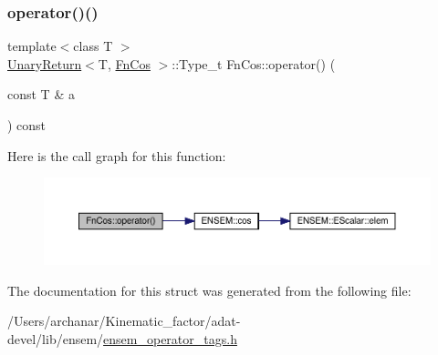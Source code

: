 \subsubsection{\texorpdfstring{operator()()}{operator()()}\hspace{0.1cm}{\footnotesize\ttfamily [3/3]}}
{\footnotesize\ttfamily template$<$class T $>$ \\
\mbox{\hyperlink{structUnaryReturn}{Unary\+Return}}$<$T, \mbox{\hyperlink{structFnCos}{Fn\+Cos}} $>$\+::Type\+\_\+t Fn\+Cos\+::operator() (\begin{DoxyParamCaption}\item[{const T \&}]{a }\end{DoxyParamCaption}) const\hspace{0.3cm}{\ttfamily [inline]}}

Here is the call graph for this function\+:
\nopagebreak
\begin{figure}[H]
\begin{center}
\leavevmode
\includegraphics[width=350pt]{d1/d49/structFnCos_aaf33b1555b7687d8c211c90189ef0c5c_cgraph}
\end{center}
\end{figure}


The documentation for this struct was generated from the following file\+:\begin{DoxyCompactItemize}
\item 
/\+Users/archanar/\+Kinematic\+\_\+factor/adat-\/devel/lib/ensem/\mbox{\hyperlink{adat-devel_2lib_2ensem_2ensem__operator__tags_8h}{ensem\+\_\+operator\+\_\+tags.\+h}}\end{DoxyCompactItemize}
